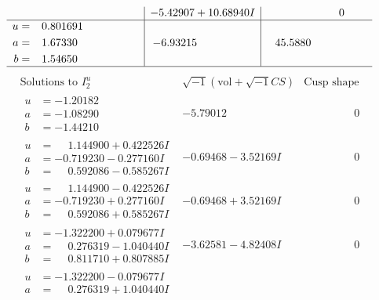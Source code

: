 \documentclass[1p]{elsarticle_modified}
\theoremstyle{definition}
\newcommand{\I}{\sqrt{-1}}
\begin{document}
$$\begin{array}{c|c|c}
 & -5.42907 + 10.68940 I & \phantom{-0.000000 } 0 \\ \hline\begin{aligned}
u &= \phantom{-}0.801691\phantom{ +0.000000I} \\
a &= \phantom{-}1.67330\phantom{ +0.000000I} \\
b &= \phantom{-}1.54650\phantom{ +0.000000I}\end{aligned}
 & -6.93215\phantom{ +0.000000I} & \phantom{-}45.5880\phantom{ +0.000000I}\\
 \hline 
 \end{array}$$\newpage$$\begin{array}{c|c|c}  
\text{Solutions to }I^u_{2}& \I (\text{vol} + \sqrt{-1}CS) & \text{Cusp shape}\\
 \hline 
\begin{aligned}
u &= -1.20182\phantom{ +0.000000I} \\
a &= -1.08290\phantom{ +0.000000I} \\
b &= -1.44210\phantom{ +0.000000I}\end{aligned}
 & -5.79012\phantom{ +0.000000I} & \phantom{-0.000000 } 0 \\ \hline\begin{aligned}
u &= \phantom{-}1.144900 + 0.422526 I \\
a &= -0.719230 - 0.277160 I \\
b &= \phantom{-}0.592086 - 0.585267 I\end{aligned}
 & -0.69468 - 3.52169 I & \phantom{-0.000000 } 0 \\ \hline\begin{aligned}
u &= \phantom{-}1.144900 - 0.422526 I \\
a &= -0.719230 + 0.277160 I \\
b &= \phantom{-}0.592086 + 0.585267 I\end{aligned}
 & -0.69468 + 3.52169 I & \phantom{-0.000000 } 0 \\ \hline\begin{aligned}
u &= -1.322200 + 0.079677 I \\
a &= \phantom{-}0.276319 - 1.040440 I \\
b &= \phantom{-}0.811710 + 0.807885 I\end{aligned}
 & -3.62581 - 4.82408 I & \phantom{-0.000000 } 0 \\ \hline\begin{aligned}
u &= -1.322200 - 0.079677 I \\
a &= \phantom{-}0.276319 + 1.040440 I \\

\end{aligned}
\end{array}$$
\end{document}
